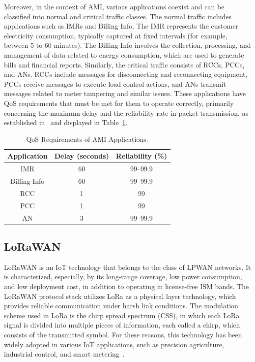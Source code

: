\documentclass[a4paper,fleqn]{cas-dc}
\begin{document}
Moreover, in the context of AMI, various applications coexist and can be classified into normal and critical traffic classes. The normal traffic includes applications such as \gls{IMRs} and Billing Info. The IMR represents the customer electricity consumption, typically captured at fixed intervals (for example, between 5 to 60 minutes). The Billing Info involves the collection, processing, and management of data related to energy consumption, which are used to generate bills and financial reports. Similarly, the critical traffic consists of \gls{RCCs}, \gls{PCCs}, and \gls{ANs}. \gls{RCCs} include messages for disconnecting and reconnecting equipment, \gls{PCCs} receive messages to execute load control actions, and \gls{ANs} transmit messages related to meter tampering and similar issues. These applications have \gls{QoS} requirements that must be met for them to operate correctly, primarily concerning the maximum delay and the reliability rate in packet transmission, as established in~\cite{khan2022qos, khan2023qos} and displayed in Table~\ref{tab:app_qos}.

\begin{table}[ht]
    \centering
    \caption{\gls{QoS} Requirements of \gls{AMI} Applications.}
    \begin{tabular}{ccc}
        \hline \hline
        Application & Delay (seconds) & Reliability (\%) \\ \hline
        IMR & 60 & 99--99.9\\
        Billing Info & 60 & 99--99.9\\
        RCC & 1 & 99 \\ 
        PCC & 1 & 99 \\ 
        AN & 3 & 99--99.9\\ \hline \hline
    \end{tabular}
    \label{tab:app_qos}
\end{table}

\subsection{LoRaWAN} \label{sec:lorawan}

\gls{LoRaWAN} is an \gls{IoT} technology that belongs to the class of \gls{LPWAN} networks. It is characterized, especially, by its long-range coverage, low power consumption, and low deployment cost, in addition to operating in license-free \gls{ISM} bands. The \gls{LoRaWAN} protocol stack utilizes \gls{LoRa} as a physical layer technology, which provides reliable communication under harsh link conditions. The modulation scheme used in LoRa is the chirp spread spectrum (CSS), in which each \gls{LoRa} signal is divided into multiple pieces of information, each called a chirp, which consists of the transmitted symbol. For these reasons, this technology has been widely adopted in various \gls{IoT} applications, such as precision agriculture, industrial control, and smart metering~\cite{jouhari2023lorawan}.
\end{document}
